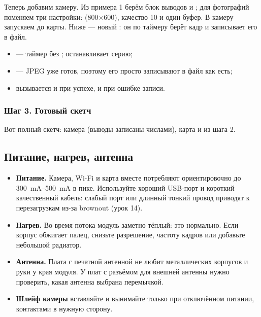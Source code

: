 Теперь добавим камеру. Из примера 1 берём блок выводов и ; для фотографий поменяем
три настройки:  (800$\times$600), качество 10 и один буфер. В  камеру запускаем
до карты. Ниже --- новый : он по таймеру берёт кадр и записывает его в файл.


\begin{itemize}[leftmargin=*]
  \item {} --- таймер без ;  останавливает серию;
  \item {} --- JPEG уже готов, поэтому его просто записывают в файл как есть;
  \item {} вызывается и при успехе, и при ошибке записи.
\end{itemize}

\subsubsection{Шаг 3. Готовый скетч}

Вот полный скетч: камера (выводы записаны числами), карта и  из шага 2.


\subsection{Питание, нагрев, антенна}

\begin{itemize}[leftmargin=*]
  \item \textbf{Питание.} Камера, Wi-Fi и карта вместе потребляют ориентировочно до \SIrange{300}{500}{mA}
        в пике. Используйте хороший USB-порт и короткий качественный кабель: слабый порт или длинный
        тонкий провод приводят к перезагрузкам из-за brownout (урок 14).
  \item \textbf{Нагрев.} Во время потока модуль заметно тёплый: это нормально. Если корпус обжигает
        палец, снизьте разрешение, частоту кадров или добавьте небольшой радиатор.
  \item \textbf{Антенна.} Плата с печатной антенной не любит металлических корпусов и руки у края модуля.
        У плат с разъёмом для внешней антенны нужно проверить, какая антенна выбрана перемычкой.
  \item \textbf{Шлейф камеры} вставляйте и вынимайте только при отключённом питании, контактами в нужную сторону.
\end{itemize}

